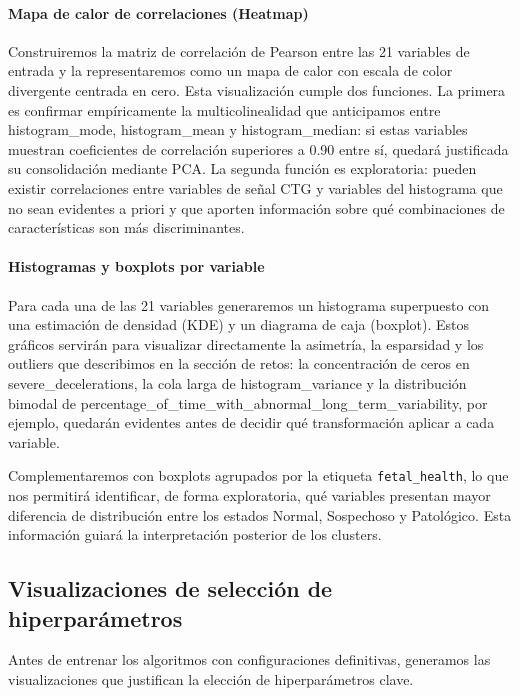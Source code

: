\documentclass[12pt,letterpaper]{article}
\begin{document}
\paragraph{Mapa de calor de correlaciones (Heatmap)}
Construiremos la matriz de correlación de Pearson entre las 21 variables de entrada y la
representaremos como un mapa de calor con escala de color divergente centrada en cero. Esta
visualización cumple dos funciones. La primera es confirmar empíricamente la multicolinealidad que
anticipamos entre histogram\_mode, histogram\_mean y histogram\_median: si estas variables muestran
coeficientes de correlación superiores a 0.90 entre sí, quedará justificada su consolidación
mediante PCA. La segunda función es exploratoria: pueden existir correlaciones entre variables de
señal CTG y variables del histograma que no sean evidentes a priori y que aporten información sobre
qué combinaciones de características son más discriminantes.

\paragraph{Histogramas y boxplots por variable}
Para cada una de las 21 variables generaremos un histograma superpuesto con una estimación de
densidad (KDE) y un diagrama de caja (boxplot). Estos gráficos servirán para visualizar
directamente la asimetría, la esparsidad y los outliers que describimos en la sección de retos:
la concentración de ceros en severe\_decelerations, la cola larga de histogram\_variance y la
distribución bimodal de percentage\_of\_time\_with\_abnormal\_long\_term\_variability, por ejemplo,
quedarán evidentes antes de decidir qué transformación aplicar a cada variable.

Complementaremos con boxplots agrupados por la etiqueta \texttt{fetal\_health}, lo que nos
permitirá identificar, de forma exploratoria, qué variables presentan mayor diferencia de
distribución entre los estados Normal, Sospechoso y Patológico. Esta información guiará la
interpretación posterior de los clusters.

\subsection{Visualizaciones de selección de hiperparámetros}

Antes de entrenar los algoritmos con configuraciones definitivas, generamos las visualizaciones que
justifican la elección de hiperparámetros clave.
\end{document}
